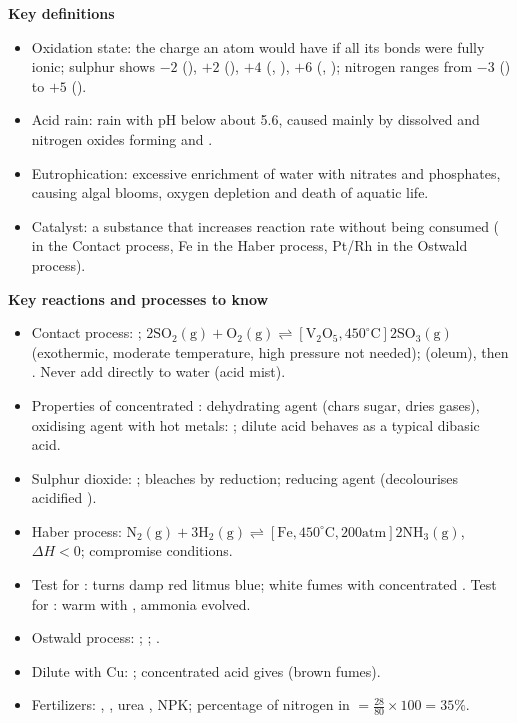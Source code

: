 \documentclass[11pt]{article}
\providecommand{\degree}{^{\circ}}
\newcommand{\cle}[1]{{\popxbold\color{popdark}#1}}
\begin{document}
\begin{bilan}
\textbf{Key definitions}
\begin{itemize}
\item \cle{Oxidation state}: the charge an atom would have if all its bonds were fully ionic; sulphur shows $-2$ (), $+2$ (), $+4$ (, ), $+6$ (, ); nitrogen ranges from $-3$ () to $+5$ ().
\item \cle{Acid rain}: rain with pH below about 5.6, caused mainly by dissolved  and nitrogen oxides forming  and .
\item \cle{Eutrophication}: excessive enrichment of water with nitrates and phosphates, causing algal blooms, oxygen depletion and death of aquatic life.
\item \cle{Catalyst}: a substance that increases reaction rate without being consumed ( in the Contact process, Fe in the Haber process, Pt/Rh in the Ostwald process).
\end{itemize}

\textbf{Key reactions and processes to know}
\begin{itemize}
\item Contact process: ; \ensuremath{\mathrm{2SO_{2}(g) + O_{2}(g) \rightleftharpoons [V_{2}O_{5}, 450\degree C] 2SO_{3}(g)}} (exothermic, moderate temperature, high pressure not needed);  (oleum), then . Never add  directly to water (acid mist).
\item Properties of concentrated : dehydrating agent (chars sugar, dries gases), oxidising agent with hot metals: ; dilute acid behaves as a typical dibasic acid.
\item Sulphur dioxide: ; bleaches by reduction; reducing agent (decolourises acidified ).
\item Haber process: \ensuremath{\mathrm{N_{2}(g) + 3H_{2}(g) \rightleftharpoons [Fe, 450\degree C, 200 atm] 2NH_{3}(g)}}, $\Delta H < 0$; compromise conditions.
\item Test for : turns damp red litmus blue; white fumes with concentrated . Test for : warm with , ammonia evolved.
\item Ostwald process: ; ; .
\item Dilute  with Cu: ; concentrated acid gives  (brown fumes).
\item Fertilizers: , , urea , NPK; percentage of nitrogen in  $= \frac{28}{80}\times 100 = 35\%$.
\end{itemize}


\end{bilan}
\end{document}
